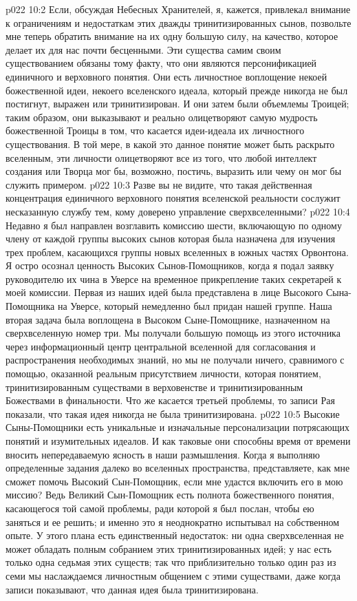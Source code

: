 \vs p022 10:2 \pc Если, обсуждая Небесных Хранителей, я, кажется, привлекал внимание к ограничениям и недостаткам этих дважды тринитизированных сынов, позвольте мне теперь обратить внимание на их одну большую силу, на качество, которое делает их для нас почти бесценными. Эти существа самим своим существованием обязаны тому факту, что они являются персонификацией единичного и верховного понятия. Они есть личностное воплощение некоей божественной идеи, некоего вселенского идеала, который прежде никогда не был постигнут, выражен или тринитизирован. И они затем были объемлемы Троицей; таким образом, они выказывают и реально олицетворяют самую мудрость божественной Троицы в том, что касается идеи\hyp{}идеала их личностного существования. В той мере, в какой это данное понятие может быть раскрыто вселенным, эти личности олицетворяют все из того, что любой интеллект создания или Творца мог бы, возможно, постичь, выразить или чему он мог бы служить примером. 
\vs p022 10:3 Разве вы не видите, что такая действенная концентрация единичного верховного понятия вселенской реальности сослужит несказанную службу тем, кому доверено управление сверхвселенными?
\vs p022 10:4 \pc Недавно я был направлен возглавить комиссию шести, включающую по одному члену от каждой группы высоких сынов которая была назначена для изучения трех проблем, касающихся группы новых вселенных в южных частях Орвонтона. Я остро осознал ценность Высоких Сынов\hyp{}Помощников, когда я подал заявку руководителю их чина в Уверсе на временное прикрепление таких секретарей к моей комиссии. Первая из наших идей была представлена в лице Высокого Сына\hyp{}Помощника на Уверсе, который немедленно был придан нашей группе. Наша вторая задача была воплощена в Высоком Сыне\hyp{}Помощнике, назначенном на сверхвселенную номер три. Мы получали большую помощь из этого источника через информационный центр центральной вселенной для согласования и распространения необходимых знаний, но мы не получали ничего, сравнимого с помощью, оказанной реальным присутствием личности, которая  понятием, тринитизированным существами в верховенстве и тринитизированным Божествами в финальности. Что же касается третьей проблемы, то записи Рая показали, что такая идея никогда не была тринитизирована.
\vs p022 10:5 \pc Высокие Сыны\hyp{}Помощники есть уникальные и изначальные персонализации потрясающих понятий и изумительных идеалов. И как таковые они способны время от времени вносить непередаваемую ясность в наши размышления. Когда я выполняю определенные задания далеко во вселенных пространства, представляете, как мне сможет помочь Высокий Сын\hyp{}Помощник, если мне удастся включить его в мою миссию? Ведь Великий Сын\hyp{}Помощник есть полнота божественного понятия, касающегося той самой проблемы, ради которой я был послан, чтобы ею заняться и ее решить; и именно это я неоднократно испытывал на собственном опыте. У этого плана есть единственный недостаток: ни одна сверхвселенная не может обладать полным собранием этих тринитизированных идей; у нас есть только одна седьмая этих существ; так что приблизительно только один раз из семи мы наслаждаемся личностным общением с этими существами, даже когда записи показывают, что данная идея была тринитизирована.
